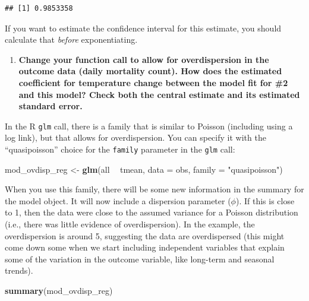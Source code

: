 \documentclass[
]{book}
\newenvironment{Shaded}{\begin{snugshade}}{\end{snugshade}}
\newcommand{\DataTypeTok}[1]{\textcolor[rgb]{0.13,0.29,0.53}{#1}}
\newcommand{\KeywordTok}[1]{\textcolor[rgb]{0.13,0.29,0.53}{\textbf{#1}}}
\newcommand{\NormalTok}[1]{#1}
\newcommand{\OperatorTok}[1]{\textcolor[rgb]{0.81,0.36,0.00}{\textbf{#1}}}
\newcommand{\StringTok}[1]{\textcolor[rgb]{0.31,0.60,0.02}{#1}}
\providecommand{\tightlist}{%
  \setlength{\itemsep}{0pt}\setlength{\parskip}{0pt}}
\begin{document}
\begin{verbatim}
## [1] 0.9853358
\end{verbatim}

If you want to estimate the confidence interval for this estimate, you should
calculate that \emph{before} exponentiating.

\begin{enumerate}
\def\labelenumi{\arabic{enumi}.}
\setcounter{enumi}{2}
\tightlist
\item
  \textbf{Change your function call to allow for overdispersion in the outcome data
  (daily mortality count). How does the estimated coefficient for temperature
  change between the model fit for \#2 and this model? Check both the central
  estimate and its estimated standard error.}
\end{enumerate}

In the R \texttt{glm} call, there is a family that is similar to Poisson (including
using a log link), but that allows for overdispersion. You can specify it
with the ``quasipoisson'' choice for the \texttt{family} parameter in the \texttt{glm} call:

\begin{Shaded}
\begin{Highlighting}[]
\NormalTok{mod_ovdisp_reg <-}\StringTok{ }\KeywordTok{glm}\NormalTok{(all }\OperatorTok{~}\StringTok{ }\NormalTok{tmean, }\DataTypeTok{data =}\NormalTok{ obs, }\DataTypeTok{family =} \StringTok{"quasipoisson"}\NormalTok{)}
\end{Highlighting}
\end{Shaded}

When you use this family, there will be some new information in the summary
for the model object. It will now include a dispersion parameter (\(\phi\)). If this
is close to 1, then the data were close to the assumed variance for a Poisson
distribution (i.e., there was little evidence of overdispersion). In the
example, the overdispersion is around 5, suggesting the data are overdispersed
(this might come down some when we start including independent variables that
explain some of the variation in the outcome variable, like long-term and
seasonal trends).

\begin{Shaded}
\begin{Highlighting}[]
\KeywordTok{summary}\NormalTok{(mod_ovdisp_reg)}
\end{Highlighting}
\end{Shaded}
\end{document}
